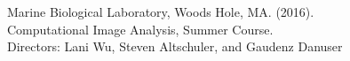 Marine Biological Laboratory, Woods Hole, MA. (2016). \\
Computational Image Analysis, Summer Course. \\
Directors: Lani Wu, Steven Altschuler, and Gaudenz Danuser
